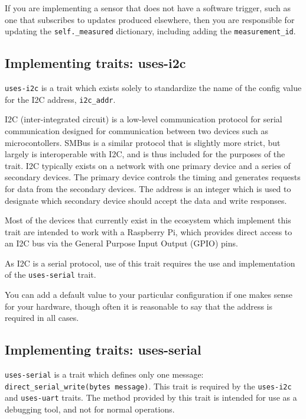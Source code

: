 If you are implementing a sensor that does not have a software trigger, such as one that subscribes to updates produced elsewhere, then you are responsible for updating the \texttt{self.\_measured} dictionary, including adding the \texttt{measurement\_id}.


\subsection{Implementing traits: uses-i2c}

\texttt{uses-i2c} is a trait which exists solely to standardize the name of the config value for the I2C address, \texttt{i2c\_addr}.

I2C (inter-integrated circuit) is a low-level communication protocol for serial communication designed for communication between two devices such as microcontollers\cite{i2c}.
SMBus\cite{smbus} is a similar protocol that is slightly more strict, but largely is interoperable with I2C, and is thus included for the purposes of the \yaq{} trait.
I2C typically exists on a network with one primary device and a series of secondary devices.
The primary device controls the timing and generates requests for data from the secondary devices.
The address is an integer which is used to designate which secondary device should accept the data and write responses.

Most of the devices that currently exist in the \yaq{} ecosystem which implement this trait are intended to work with a Raspberry Pi, which provides direct access to an I2C bus via the General Purpose Input Output (GPIO) pins.

As I2C is a serial protocol, use of this trait requires the use and implementation of the \texttt{uses-serial} trait.

You can add a default value to your particular configuration if one makes sense for your hardware, though often it is reasonable to say that the address is required in all cases.

\subsection{Implementing traits: uses-serial}

\texttt{uses-serial} is a trait which defines only one message: \texttt{direct\_serial\_write(bytes message)}.
This trait is required by the \texttt{uses-i2c} and \texttt{uses-uart} traits.
The method provided by this trait is intended for use as a debugging tool, and not for normal operations.

